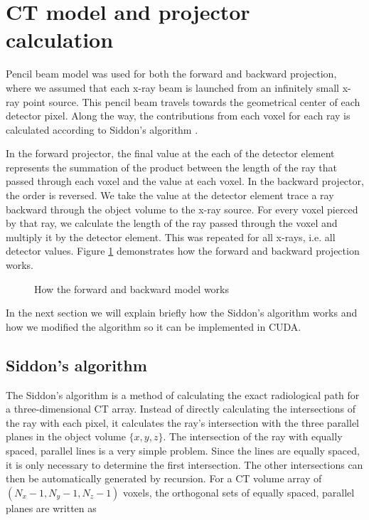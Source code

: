 \section{CT model and projector calculation}
Pencil beam model was used for both the forward and backward projection, where we assumed that each x-ray beam is launched from an infinitely small x-ray point source. This pencil beam travels towards the geometrical center of each detector pixel.  Along the way, the contributions from each voxel for each ray is calculated according to Siddon's algorithm \cite{Siddon1985}.  

In the forward projector, the final value at the each of the detector element represents the summation of the product between the length of the ray that passed through each voxel and the value at each voxel.  In the backward projector, the order is reversed. We take the value at the detector element trace a ray backward through the object volume to the x-ray source.  For every voxel pierced by that ray, we calculate the length of the ray passed through the voxel and multiply it by the detector element.  This was repeated for all x-rays, i.e. all detector values.  Figure \ref{fig:forward_backward_model} demonstrates how the forward and backward projection works.

\begin{figure}
\centering
	\begin{subfigure}[b]{0.4\linewidth}
	\centering
	\end{subfigure}
\hspace{0.2cm}
	\begin{subfigure}[b]{0.4\linewidth}
	\centering
	\end{subfigure}
\caption{How the forward and backward model works}
\label{fig:forward_backward_model}
\end{figure}

In the next section we will explain briefly how the Siddon's algorithm works and how we modified the algorithm so it can be implemented in CUDA. 

\subsection{Siddon's algorithm}
The Siddon's algorithm is a method of calculating the exact radiological path for a three-dimensional CT array.  Instead of directly calculating the intersections of the ray with each pixel, it calculates the ray's intersection with the three parallel planes in the object volume $\{ x, y, z \}$.  The intersection of the ray with equally spaced, parallel lines is a very simple problem.  Since the lines are equally spaced, it is only necessary to determine the first intersection.  The other intersections can then be automatically generated by recursion.  For a CT volume array of $(N_x -1, N_y-1, N_z-1)$ voxels, the orthogonal sets of equally spaced, parallel planes are written as

